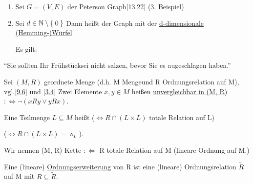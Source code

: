 \documentclass{../../meta/tudscript}
\begin{document}
    \begin{enumerate}

    \item Sei $G = (V, E)$ der Peterson Graph\ref{13.22} (3. Beispiel)

    \item Sei $d \in \mathbb{N} \setminus \Set{0}$ Dann heißt der Graph
        mit
        der \underline{d-dimensionale (Hemming-)Würfel}
        
        Es gilt:

    \end{enumerate} 
    \enquote{Sie sollten Ihr Frühstücksei nicht salzen, bevor Sie es augeschlagen haben.}

        Sei $(M, R)$ geordnete Menge (d.h. M Mengeund R Ordnungsrelation auf M), vgl.\ref{9.6} und \ref{3.4}
        Zwei Elemente $x,y \in M$ heißen \underline{unvergleichbar in (M, R)} $:\iff \neg (xRy \lor yRx)$.
        
        Eine Teilmenge $L \subseteq M$ heißt 
        ($\iff R \cap (L \times L)$ totale Relation auf L)
    
        ($\iff R \cap (L \times L) = \vartriangle_L$).

        Wir nennen (M, R) Kette $:\iff$ R totale Relation auf M (lineare Ordnung auf M.)

        Eine (lineare) \underline{Ordnungserweiterung} von R ist eine (lineare)
        Ordnungsrelation $\tilde{R}$ auf M mit $R \subseteq \tilde{R}$.
\end{document}
